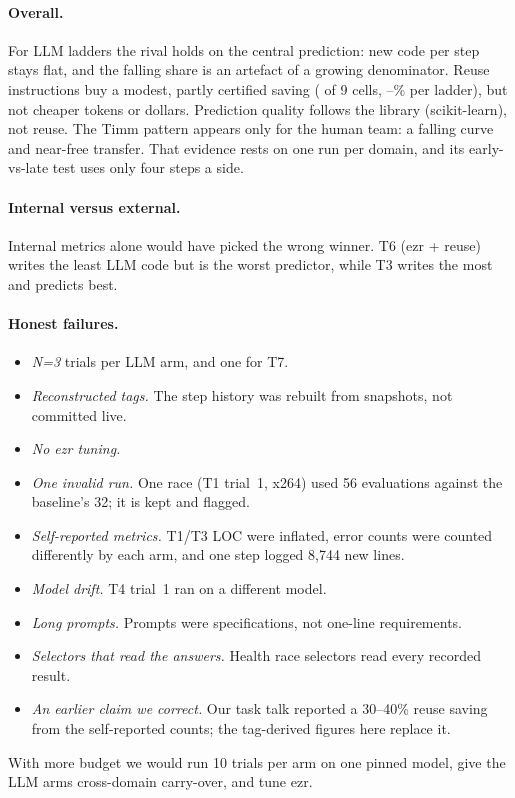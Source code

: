 \documentclass[acmsmall,nonacm]{acmart}
\begin{document}
\paragraph{Overall.} For LLM ladders the rival holds on the central prediction: new code per step stays flat, and the falling share is an artefact of a growing denominator. Reuse instructions buy a modest, partly certified saving (\reuseCertified{} of 9 cells, \savePython--\saveezr\% per ladder), but not cheaper tokens or dollars. Prediction quality follows the library (scikit-learn), not reuse. The Timm pattern appears only for the human team: a falling curve and near-free transfer. That evidence rests on one run per domain, and its early-vs-late test uses only four steps a side.

\paragraph{Internal versus external.} Internal metrics alone would have picked the wrong winner. T6 (ezr + reuse) writes the least LLM code but is the worst predictor, while T3 writes the most and predicts best.

\paragraph{Honest failures.}
\begin{itemize}
\item \emph{N=3} trials per LLM arm, and one for T7.
\item \emph{Reconstructed tags.} The step history was rebuilt from snapshots, not committed live.
\item \emph{No ezr tuning.}
\item \emph{One invalid run.} One race (T1 trial~1, x264) used 56 evaluations against the baseline's 32; it is kept and flagged.
\item \emph{Self-reported metrics.} T1/T3 LOC were inflated, error counts were counted differently by each arm, and one step logged 8,744 new lines.
\item \emph{Model drift.} T4 trial~1 ran on a different model.
\item \emph{Long prompts.} Prompts were specifications, not one-line requirements.
\item \emph{Selectors that read the answers.} Health race selectors read every recorded result.
\item \emph{An earlier claim we correct.} Our task talk reported a 30--40\% reuse saving from the self-reported counts; the tag-derived figures here replace it.
\end{itemize}
With more budget we would run 10 trials per arm on one pinned model, give the LLM arms cross-domain carry-over, and tune ezr.
\end{document}
